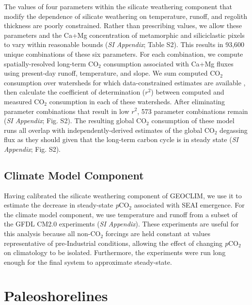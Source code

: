 \documentclass[9pt,twocolumn,twoside,lineno]{pnas-new}
\newcommand{\pCOtwo}{\textit{p}CO$_{2}$\xspace}
\newcommand{\COtwo}{CO$_{2}$\xspace}
\newcommand{\SI}{\textit{SI Appendix}\xspace}
\begin{document}
The values of four parameters within the silicate weathering component that modify the dependence of silicate weathering on temperature, runoff, and regolith thickness are poorly constrained. Rather than prescribing values, we allow these parameters and the Ca+Mg concentration of metamorphic and siliciclastic pixels to vary within reasonable bounds (\SI; Table S2). This results in 93,600 unique combinations of these six parameters. For each combination, we compute spatially-resolved long-term \COtwo consumption associated with Ca+Mg fluxes using present-day runoff, temperature, and slope. We sum computed \COtwo consumption over watersheds for which data-constrained estimates are available \cite{Gaillardet1999a, Moquet2018a}, then calculate the coefficient of determination ($r^{2}$) between computed and measured \COtwo consumption in each of these watersheds. After eliminating parameter combinations that result in low $r^{2}$, 573 parameter combinations remain (\SI; Fig. S2). The resulting global \COtwo consumption of these model runs all overlap with independently-derived estimates of the global \COtwo degassing flux \cite{Gerlach2011a} as they should given that the long-term carbon cycle is in steady state (\SI; Fig. S2).

\subsection*{Climate Model Component}

Having calibrated the silicate weathering component of GEOCLIM, we use it to estimate the decrease in steady-state \pCOtwo associated with SEAI emergence. For the climate model component, we use temperature and runoff from a subset of the GFDL CM2.0 experiments \cite{Delworth2006b} (\SI). These experiments are useful for this analysis because all non-\COtwo forcings are held constant at values representative of pre-Industrial conditions, allowing the effect of changing \pCOtwo on climatology to be isolated. Furthermore, the experiments were run long enough for the final system to approximate steady-state.

\section*{Paleoshorelines}
\end{document}
